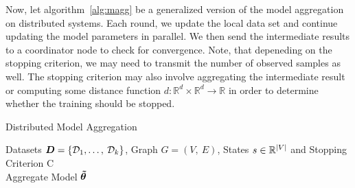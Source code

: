 Now, let algorithm~\ref{alg:magg} be a generalized version of the model aggregation on distributed systems. 
Each round, we update the local data set and continue updating the model parameters in parallel. 
We then send the intermediate results to a coordinator node to check for convergence.
Note, that depeneding on the stopping criterion, we may need to transmit the number of observed samples as well. 
The stopping criterion may also involve aggregating the intermediate result or computing some distance function $d: \mathbb{R}^d \times \mathbb{R}^d  \rightarrow \mathbb{R}$ in order to determine whether the training should be stopped.
\begin{algo}{Distributed Model Aggregation}
\begin{algorithmic}[1]
    \label{alg:magg}
    \REQUIRE Datasets $\mathcal{\boldsymbol{D}} = \{\mathcal{D}_1, \ldots,\: \mathcal{D}_k\}$, Graph $G=(V,\:E)$, States $s \in \mathbb{R}^{\lvert V\rvert}$ and Stopping Criterion C \\
    \ENSURE Aggregate Model $\vect{\tilde{\theta}}$  \\
     \\
     \\
         \\
    \ENDIF
    \ENDWHILE
    \ENDFOR
    \\
    \RETURN {$\vect{\tilde{\theta}}$}
\end{algorithmic}
\end{algo}

